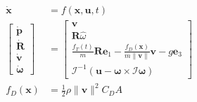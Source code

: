 \documentclass[11pt]{article}
\begin{document}
\begin{align*}
    \dot{\mathbf{x}} &= f(\mathbf{x}, \mathbf{u}, t) \\
    \begin{bmatrix}
        \dot{\mathbf{p}} \\
        \dot{\mathbf{R}} \\
        \dot{\mathbf{v}} \\
        \dot{\mathbf{\omega}}
    \end{bmatrix}
     &= \begin{bmatrix}
        \mathbf{v} \\
        \mathbf{R} \hat{\omega} \\
        \frac{f_T(t)}{m} \mathbf{R} \mathbf{e}_1 - \frac{f_D(\mathbf{x})}{m\|\mathbf{v}\|} \mathbf{v} - g\mathbf{e}_3 \\
        \mathcal{I}^{-1} \left( \mathbf{u} - \mathbf{\omega} \times \mathcal{I} \mathbf{\omega} \right)
     \end{bmatrix} \\
     f_D(\mathbf{x}) &= \frac{1}{2} \rho \|\mathbf{v}\|^2 C_D A
\end{align*}
\end{document}
